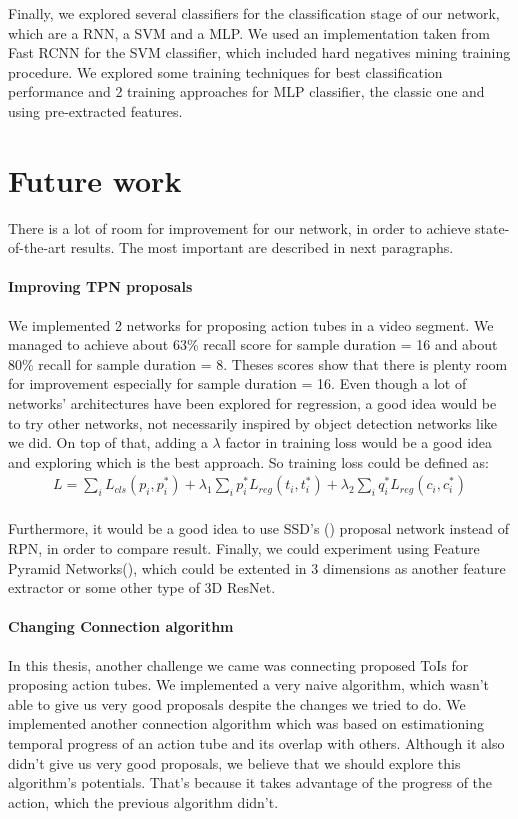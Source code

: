 Finally, we explored several classifiers for the classification stage of our network, which are a RNN, a SVM and a MLP.  We used an implementation taken from Fast RCNN
for the SVM classifier, which included hard negatives mining training procedure. We explored some training techniques for best classification performance and
2 training approaches for MLP classifier, the classic one and using pre-extracted features. 

\section{Future work}
There is a lot of room for improvement for our network, in order to achieve state-of-the-art results. The most important are described in next paragraphs.

\paragraph{Improving TPN proposals} We implemented 2 networks for proposing action tubes in a video segment. We managed to achieve about 63\% recall score for
sample duration = 16 and about 80\% recall for sample duration = 8. Theses scores show that there is plenty room for improvement especially for sample duration = 16.
Even though a lot of networks' architectures have been explored for regression, a good idea would be to try other networks, not necessarily inspired by object detection
networks like we did. On top of that, adding a $\lambda$ factor in training loss would be a good idea and exploring which is the best approach.
So training loss could be defined as:
\begin{equation} 
\begin{split}
 L  =  \sum_iL_{cls}(p_i, p_i^*) + \lambda_1 \sum_ip_i^*L_{reg}(t_i,t_i^*) + \lambda_2  \sum_iq_i^*L_{reg}(c_{i}, c_{i}^*) \\
\end{split}
\end{equation}

Furthermore, it would be a good idea to use SSD's (\cite{DBLP:journals/corr/LiuAESR15}) proposal network instead of RPN, in order to compare result. Finally,
we could experiment using Feature Pyramid Networks(\cite{8099589}), which could be extented in 3 dimensions as another feature extractor or some other type of 3D ResNet.

\paragraph{Changing Connection algorithm}
In this thesis, another challenge we came was connecting proposed ToIs for proposing action tubes. We implemented a very naive algorithm, which wasn't
able to give us very good proposals despite the changes we tried to do. We implemented another connection algorithm which was based on estimationing temporal
progress of an action tube  and its overlap with others. Although it also didn't give us very good proposals, we believe that we should explore this algorithm's potentials. That's
because it takes advantage of the progress of the action, which the previous algorithm didn't.


